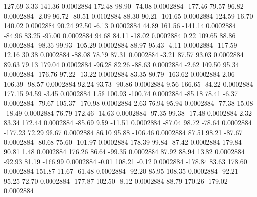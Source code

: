       127.69        3.33      141.36     0.0002884
      172.48       98.90      -74.08     0.0002884
     -177.46       79.57       96.82     0.0002884
       -2.09       96.72      -80.51     0.0002884
       88.30       90.21     -101.65     0.0002884
      124.59       16.70      140.02     0.0002884
       90.24       92.50       -6.13     0.0002884
       44.89      161.56     -141.14     0.0002884
      -84.96       83.25      -97.00     0.0002884
       94.68       84.11      -18.02     0.0002884
        0.22      109.65       88.86     0.0002884
      -98.36       99.93     -105.29     0.0002884
       88.97       95.43       -4.11     0.0002884
     -117.59       12.16       30.38     0.0002884
      -88.08       78.79       87.31     0.0002884
       -3.21       87.57       93.03     0.0002884
       89.63       79.13      179.04     0.0002884
      -96.28       82.26      -88.63     0.0002884
       -2.62      109.50       95.34     0.0002884
     -176.76       97.22      -13.22     0.0002884
       83.35       80.79     -163.62     0.0002884
        2.06      106.39      -98.57     0.0002884
       92.24       93.73      -90.86     0.0002884
        9.56      166.65      -84.22     0.0002884
      177.15       94.59       -3.45     0.0002884
        1.58      100.93     -100.74     0.0002884
      -85.18       78.41       -6.37     0.0002884
      -79.67      105.37     -170.98     0.0002884
        2.63       76.94       95.94     0.0002884
      -77.38       15.08      -18.49     0.0002884
       76.79      172.46      -14.63     0.0002884
      -97.35       99.38      -17.48     0.0002884
        2.32       83.34      172.44     0.0002884
      -85.69        9.59      -11.51     0.0002884
      -87.04       98.72      -78.64     0.0002884
     -177.23       72.29       98.67     0.0002884
       86.10       95.88     -106.46     0.0002884
       87.51       98.21      -87.67     0.0002884
      -80.68       75.60     -101.97     0.0002884
      178.39       99.84      -87.42     0.0002884
      179.84       90.81        1.48     0.0002884
      176.26       86.64      -99.35     0.0002884
       87.92       88.94       13.82     0.0002884
      -92.93       81.19     -166.99     0.0002884
       -0.01      108.21       -0.12     0.0002884
     -178.84       83.63      178.60     0.0002884
      151.87       11.67      -61.48     0.0002884
      -92.20       85.95      108.35     0.0002884
      -92.21       95.25       72.70     0.0002884
     -177.87      102.50       -8.12     0.0002884
       88.79      170.26     -179.02     0.0002884
